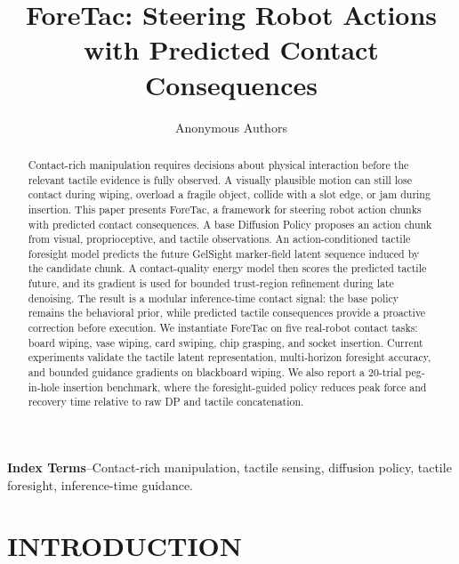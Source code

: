 \documentclass[letterpaper, 10 pt, conference]{ieeeconf}
\title{\LARGE \bf
ForeTac: Steering Robot Actions with Predicted Contact Consequences}
\author{Anonymous Authors}
\newcommand{\method}{ForeTac}
\begin{document}
\maketitle
\thispagestyle{empty}
\pagestyle{empty}

\begin{abstract}
Contact-rich manipulation requires decisions about physical interaction before
the relevant tactile evidence is fully observed. A visually plausible motion can
still lose contact during wiping, overload a fragile object, collide with a
slot edge, or jam during insertion. This paper presents \method{}, a framework
for steering robot action chunks with predicted contact consequences. A base
Diffusion Policy proposes an action chunk from visual, proprioceptive, and
tactile observations. An action-conditioned tactile foresight model predicts the
future GelSight marker-field latent sequence induced by the candidate chunk. A
contact-quality energy model then scores the predicted tactile future, and its
gradient is used for bounded trust-region refinement during late denoising. The
result is a modular inference-time contact signal: the base policy remains the
behavioral prior, while predicted tactile consequences provide a proactive
correction before execution. We instantiate \method{} on five real-robot
contact tasks: board wiping, vase wiping, card swiping, chip grasping, and
socket insertion. Current experiments validate the tactile latent
representation, multi-horizon foresight accuracy, and bounded guidance
gradients on blackboard wiping. We also report a 20-trial peg-in-hole insertion
benchmark, where the foresight-guided policy reduces peak force and recovery
time relative to raw DP and tactile concatenation.
\end{abstract}

\vspace{0.5em}
\noindent\textbf{Index Terms}--Contact-rich manipulation, tactile sensing,
diffusion policy, tactile foresight, inference-time guidance.

\section{INTRODUCTION}
\end{document}
